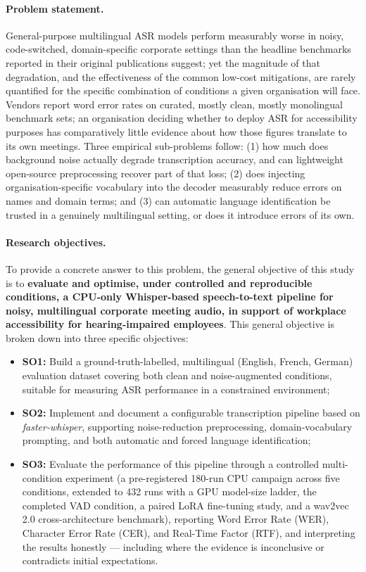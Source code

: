 \documentclass[12pt]{report}
\begin{document}
\paragraph{Problem statement.}
General-purpose multilingual ASR models perform measurably worse in noisy, code-switched, domain-specific corporate settings than the headline benchmarks reported in their original publications suggest; yet the magnitude of that degradation, and the effectiveness of the common low-cost mitigations, are rarely quantified for the specific combination of conditions a given organisation will face. Vendors report word error rates on curated, mostly clean, mostly monolingual benchmark sets; an organisation deciding whether to deploy ASR for accessibility purposes has comparatively little evidence about how those figures translate to its own meetings. Three empirical sub-problems follow: (1) how much does background noise actually degrade transcription accuracy, and can lightweight open-source preprocessing recover part of that loss; (2) does injecting organisation-specific vocabulary into the decoder measurably reduce errors on names and domain terms; and (3) can automatic language identification be trusted in a genuinely multilingual setting, or does it introduce errors of its own.

\paragraph{Research objectives.}
To provide a concrete answer to this problem, the general objective of this study is to \textbf{evaluate and optimise, under controlled and reproducible conditions, a CPU-only Whisper-based speech-to-text pipeline for noisy, multilingual corporate meeting audio, in support of workplace accessibility for hearing-impaired employees}. This general objective is broken down into three specific objectives:
\begin{itemize}
    \item \textbf{SO1:} Build a ground-truth-labelled, multilingual (English, French, German) evaluation dataset covering both clean and noise-augmented conditions, suitable for measuring ASR performance in a constrained environment;
    \item \textbf{SO2:} Implement and document a configurable transcription pipeline based on \textit{faster-whisper}, supporting noise-reduction preprocessing, domain-vocabulary prompting, and both automatic and forced language identification;
    \item \textbf{SO3:} Evaluate the performance of this pipeline through a controlled multi-condition experiment (a pre-registered 180-run CPU campaign across five conditions, extended to 432 runs with a GPU model-size ladder, the completed VAD condition, a paired LoRA fine-tuning study, and a wav2vec 2.0 cross-architecture benchmark), reporting Word Error Rate (WER), Character Error Rate (CER), and Real-Time Factor (RTF), and interpreting the results honestly --- including where the evidence is inconclusive or contradicts initial expectations.
\end{itemize}
\end{document}
